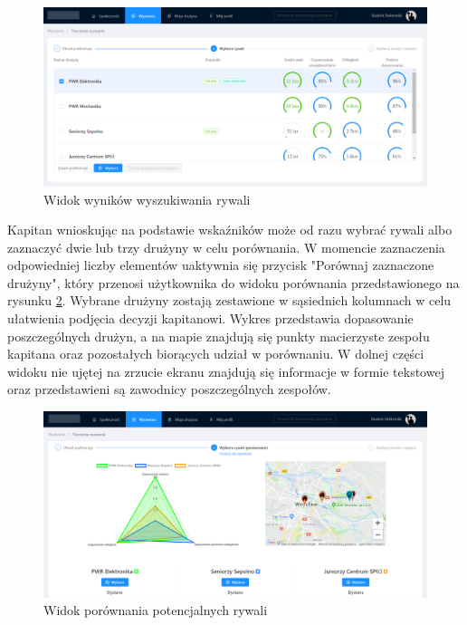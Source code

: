 \begin{figure}[H]
\centering
\includegraphics[width=\linewidth]{065-dzialanie/rys/ss-search-2.PNG}
\caption{Widok wyników wyszukiwania rywali}
\label{fig:ss-search-2}
\end{figure}

Kapitan wnioskując na podstawie wskaźników może od razu wybrać rywali albo zaznaczyć dwie lub trzy drużyny w celu porównania. W momencie zaznaczenia odpowiedniej liczby elementów uaktywnia się przycisk "Porównaj zaznaczone drużyny", który przenosi użytkownika do widoku porównania przedstawionego na rysunku \ref{fig:ss-search-4}. Wybrane drużyny zostają zestawione w sąsiednich kolumnach w celu ułatwienia podjęcia decyzji kapitanowi. Wykres przedstawia dopasowanie poszczególnych drużyn, a na mapie znajdują się punkty macierzyste zespołu kapitana oraz pozostałych biorących udział w porównaniu. W dolnej części widoku nie ujętej na zrzucie ekranu znajdują się informacje w formie tekstowej oraz przedstawieni są zawodnicy poszczególnych zespołów.

\begin{figure}[H]
\centering
\includegraphics[width=\linewidth]{065-dzialanie/rys/ss-search-4.PNG}
\caption{Widok porównania potencjalnych rywali}
\label{fig:ss-search-4}
\end{figure}


